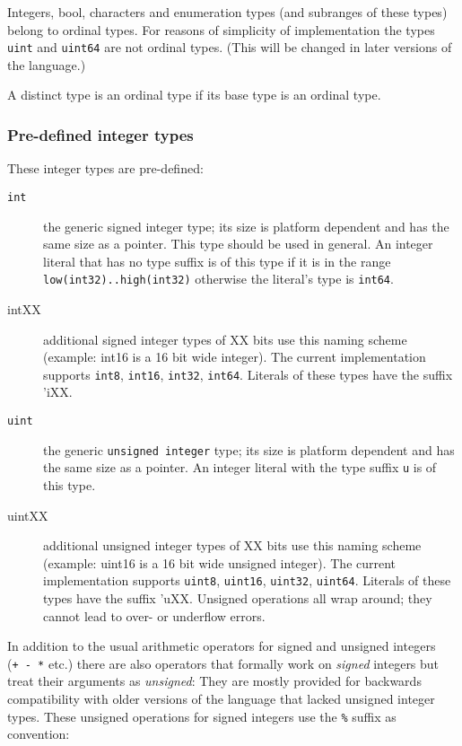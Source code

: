 Integers, bool, characters and enumeration types (and subranges of these
types) belong to ordinal types. For reasons of simplicity of
implementation the types \texttt{uint} and \texttt{uint64} are not
ordinal types. (This will be changed in later versions of the language.)

A distinct type is an ordinal type if its base type is an ordinal type.

\hypertarget{pre-defined-integer-types}{%
\subsubsection{Pre-defined integer
types}\label{pre-defined-integer-types}}

These integer types are pre-defined:

\begin{description}
\item[\texttt{int}]
the generic signed integer type; its size is platform dependent and has
the same size as a pointer. This type should be used in general. An
integer literal that has no type suffix is of this type if it is in the
range \texttt{low(int32)..high(int32)} otherwise the literal's type is
\texttt{int64}.
\item[intXX]
additional signed integer types of XX bits use this naming scheme
(example: int16 is a 16 bit wide integer). The current implementation
supports \texttt{int8}, \texttt{int16}, \texttt{int32}, \texttt{int64}.
Literals of these types have the suffix 'iXX.
\item[\texttt{uint}]
the generic \texttt{unsigned\ integer} type; its size is platform
dependent and has the same size as a pointer. An integer literal with
the type suffix \texttt{\textquotesingle{}u} is of this type.
\item[uintXX]
additional unsigned integer types of XX bits use this naming scheme
(example: uint16 is a 16 bit wide unsigned integer). The current
implementation supports \texttt{uint8}, \texttt{uint16},
\texttt{uint32}, \texttt{uint64}. Literals of these types have the
suffix 'uXX. Unsigned operations all wrap around; they cannot lead to
over- or underflow errors.
\end{description}

In addition to the usual arithmetic operators for signed and unsigned
integers (\texttt{+\ -\ *} etc.) there are also operators that formally
work on \emph{signed} integers but treat their arguments as
\emph{unsigned}: They are mostly provided for backwards compatibility
with older versions of the language that lacked unsigned integer types.
These unsigned operations for signed integers use the \texttt{\%} suffix
as convention:

